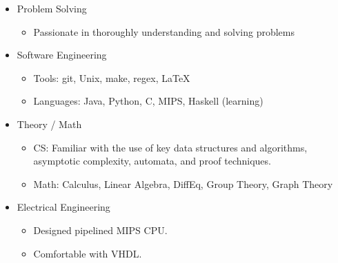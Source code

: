 \documentclass[18pt]{article}
\providecommand{\tightlist}{
    \setlength{\itemsep}{0pt}\setlength{\parskip}{0pt}
}
\begin{document}
\begin{multicols}{2}
\begin{itemize}
        \item Problem Solving
        \begin{itemize}\tightlist
          \item Passionate in thoroughly understanding and solving problems
        \end{itemize}

        \item Software Engineering
        \begin{itemize}\tightlist
          \item Tools: git, Unix, make, regex, \LaTeX
          \item Languages: Java, Python, C, MIPS, Haskell (learning)
        \end{itemize}

        \item Theory / Math
        \begin{itemize}\tightlist
          \item CS: Familiar with the use of key data structures and algorithms, asymptotic complexity, automata, and proof techniques.
          \item Math: Calculus, Linear Algebra, DiffEq, Group Theory, Graph Theory
        \end{itemize}

        \item Electrical Engineering
        \begin{itemize}\tightlist
          \item Designed pipelined MIPS CPU.
          \item Comfortable with VHDL.
        \end{itemize}

      \end{itemize} %

  \end{multicols}
\end{document}
